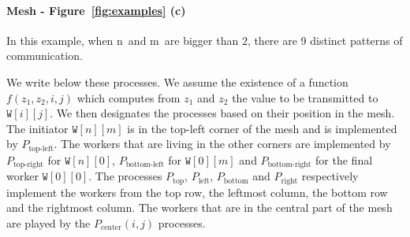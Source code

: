 \documentclass{LMCS}
\newcommand{\ii}{\ensuremath{i}}
\newcommand{\jj}{\ensuremath{j}}
\newcommand{\n}{\ensuremath{\mathrm{n}}}
\newcommand{\m}{\ensuremath{\mathrm{m}}}
\newcommand{\nn}{\ensuremath{n}}
\newcommand{\mm}{\ensuremath{m}}
\newcommand{\PP}{\ensuremath{P}}
\newcommand{\W}{\ensuremath{\mathtt{W}}}
\begin{document}
\paragraph{\bf Mesh - Figure~\ref{fig:examples} (c)}
In this example, 
when \n~and \m~are bigger than $2$, there are
9 distinct patterns of communication.  

We write below these processes. We assume the existence of a function
$f(z_1,z_2,i,j)$ which computes from $z_1$ and $z_2$ the value to be transmitted
to $\W[\ii][\jj]$. We then designates the processes based on their position in
the mesh. The initiator $\W[\nn][\mm]$ is in the top-left corner of the mesh and
is implemented by $\PP_{\text{top-left}}$. The workers that are living in the
other corners are implemented by $\PP_{\text{top-right}}$ for $\W[\nn][0]$,
$\PP_{\text{bottom-left}}$ for $\W[0][\mm]$ and $\PP_{\text{bottom-right}}$ for
the final worker $\W[0][0]$. The processes $\PP_{\text{top}}$,
$\PP_{\text{left}}$, $\PP_{\text{bottom}}$ and $\PP_{\text{right}}$ respectively
implement the workers from the top row, the leftmost column, the bottom row and
the rightmost column. The workers that are in the central part of the mesh are
played by the $\PP_{\text{center}}(\ii, \jj)$ processes.\\[2mm]
\end{document}
